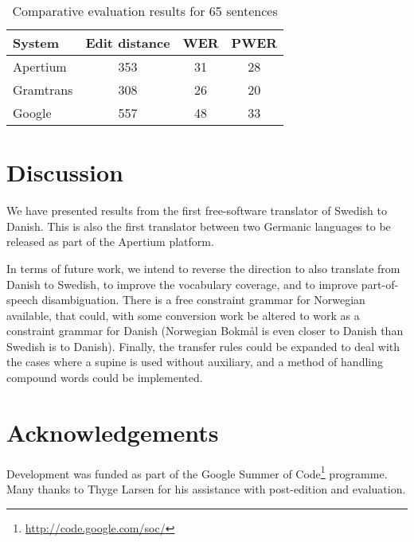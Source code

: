 \documentclass[11pt]{article}
\begin{document}
\begin{table}
\centering
\begin{tabular}{|l|c|c|c|}
\hline
System & Edit distance & WER & PWER\\
\hline
Apertium  & 353   & 31    & 28 \\
Gramtrans & 308   & 26    & 20 \\
Google    & 557   & 48    & 33 \\
\hline
\end{tabular}
    \caption{Comparative evaluation results for 65 sentences}
    \label{table:compeval}
\end{table}

\section{Discussion}

We have presented results from the first free-software translator of Swedish to Danish. This
is also the first translator between two Germanic languages to be released as part of the 
Apertium platform. 

In terms of future work, we intend to reverse the direction to also translate from Danish to 
Swedish, to improve the vocabulary coverage, and to improve part-of-speech disambiguation. There
is a free constraint grammar for Norwegian \citep{hagen2000cbt} available, that could, with some
conversion work be altered to work as a constraint grammar for Danish (Norwegian Bokmål is even
closer to Danish than Swedish is to Danish). Finally, the transfer rules could be expanded to 
deal with the cases where a supine is used without auxiliary, and a method of handling compound
words could be implemented.


\section*{Acknowledgements}

Development was funded as part of the Google Summer of Code\footnote{\url{http://code.google.com/soc/}} 
programme. Many thanks to Thyge Larsen for his assistance with post-edition and evaluation.



\end{document}
